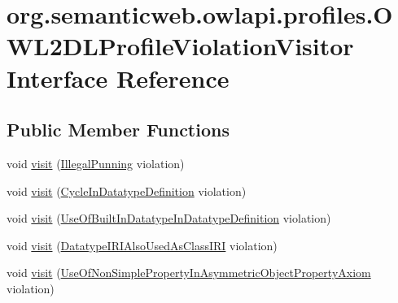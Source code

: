 \hypertarget{interfaceorg_1_1semanticweb_1_1owlapi_1_1profiles_1_1_o_w_l2_d_l_profile_violation_visitor}{\section{org.\-semanticweb.\-owlapi.\-profiles.\-O\-W\-L2\-D\-L\-Profile\-Violation\-Visitor Interface Reference}
\label{interfaceorg_1_1semanticweb_1_1owlapi_1_1profiles_1_1_o_w_l2_d_l_profile_violation_visitor}
}
\subsection*{Public Member Functions}
\begin{DoxyCompactItemize}
\item 
void \hyperlink{interfaceorg_1_1semanticweb_1_1owlapi_1_1profiles_1_1_o_w_l2_d_l_profile_violation_visitor_a5078cd4627b077ea420a3a3ffae529fe}{visit} (\hyperlink{classorg_1_1semanticweb_1_1owlapi_1_1profiles_1_1_illegal_punning}{Illegal\-Punning} violation)
\item 
void \hyperlink{interfaceorg_1_1semanticweb_1_1owlapi_1_1profiles_1_1_o_w_l2_d_l_profile_violation_visitor_a820e23a9a30490298fb95a9466c4527f}{visit} (\hyperlink{classorg_1_1semanticweb_1_1owlapi_1_1profiles_1_1_cycle_in_datatype_definition}{Cycle\-In\-Datatype\-Definition} violation)
\item 
void \hyperlink{interfaceorg_1_1semanticweb_1_1owlapi_1_1profiles_1_1_o_w_l2_d_l_profile_violation_visitor_ae6b2d159700f259a8a41e8d0f63a5fc5}{visit} (\hyperlink{classorg_1_1semanticweb_1_1owlapi_1_1profiles_1_1_use_of_built_in_datatype_in_datatype_definition}{Use\-Of\-Built\-In\-Datatype\-In\-Datatype\-Definition} violation)
\item 
void \hyperlink{interfaceorg_1_1semanticweb_1_1owlapi_1_1profiles_1_1_o_w_l2_d_l_profile_violation_visitor_a1f5179bc95ab12a016c8e357d128be12}{visit} (\hyperlink{classorg_1_1semanticweb_1_1owlapi_1_1profiles_1_1_datatype_i_r_i_also_used_as_class_i_r_i}{Datatype\-I\-R\-I\-Also\-Used\-As\-Class\-I\-R\-I} violation)
\item 
void \hyperlink{interfaceorg_1_1semanticweb_1_1owlapi_1_1profiles_1_1_o_w_l2_d_l_profile_violation_visitor_aacaa7bf28b2d325e780f3de4303ff55f}{visit} (\hyperlink{classorg_1_1semanticweb_1_1owlapi_1_1profiles_1_1_use_of_non_simple_property_in_asymmetric_object_property_axiom}{Use\-Of\-Non\-Simple\-Property\-In\-Asymmetric\-Object\-Property\-Axiom} violation)

\end{DoxyCompactItemize}
